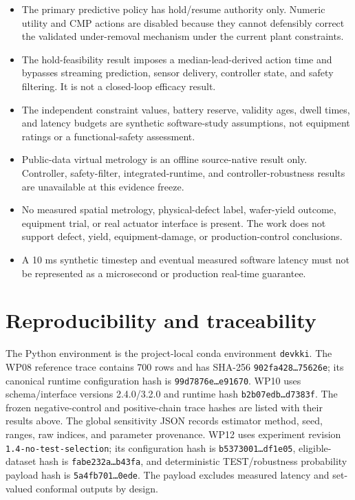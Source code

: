 \documentclass[10pt,twocolumn]{article}
\begin{document}
\begin{itemize}
  forces all diagnoses to \textsc{unknown}, and 10\% packet loss reduces
  known-cause coverage to 0.15. Diagnostic unavailability must not be treated
  as a confirmed normal state.
  \item The primary predictive policy has hold/resume authority only. Numeric
  utility and CMP actions are disabled because they cannot defensibly correct
  the validated under-removal mechanism under the current plant constraints.
  \item The hold-feasibility result imposes a median-lead-derived action time
  and bypasses streaming prediction, sensor delivery, controller state, and
  safety filtering. It is not a closed-loop efficacy result.
  \item The independent constraint values, battery reserve, validity ages,
  dwell times, and latency budgets are synthetic software-study assumptions,
  not equipment ratings or a functional-safety assessment.
  \item Public-data virtual metrology is an offline source-native result only.
  Controller, safety-filter, integrated-runtime, and controller-robustness
  results are unavailable at this evidence freeze.
  \item No measured spatial metrology, physical-defect label, wafer-yield
  outcome, equipment trial, or real actuator interface is present. The work
  does not support defect, yield, equipment-damage, or production-control
  conclusions.
  \item A 10 ms synthetic timestep and eventual measured software latency must
  not be represented as a microsecond or production real-time guarantee.
\end{itemize}

\section{Reproducibility and traceability}

The Python environment is the project-local conda environment
\texttt{devkki}. The WP08 reference trace contains 700 rows and has SHA-256
\texttt{902fa428\ldots 75626e}; its canonical runtime configuration hash is
\texttt{99d7876e\ldots e91670}. WP10 uses schema/interface versions
2.4.0/3.2.0 and runtime hash
\texttt{b2b07edb\ldots d7383f}. The frozen negative-control and positive-chain
trace hashes are listed with their results above. The global sensitivity JSON
records estimator method, seed, ranges, raw indices, and parameter provenance.
WP12 uses experiment revision \texttt{1.4-no-test-selection}; its configuration
hash is \texttt{b5373001\ldots df1e05}, eligible-dataset hash is
\texttt{fabe232a\ldots b43fa}, and deterministic TEST/robustness probability
payload hash is \texttt{5a4fb701\ldots 0ede}. The payload excludes measured
latency and set-valued conformal outputs by design.
\end{document}
